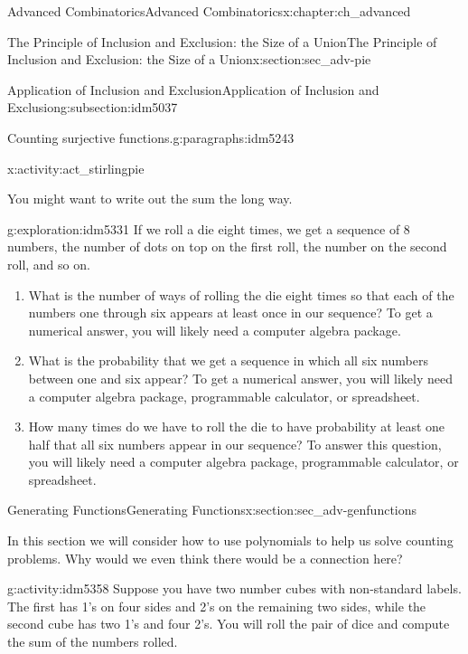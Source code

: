 \documentclass[oneside,10pt,]{book}
\numberwithin{equation}{chapter}
\begin{document}
\begin{chapterptx}{Advanced Combinatorics}{}{Advanced Combinatorics}{}{}{x:chapter:ch_advanced}
\begin{sectionptx}{The Principle of Inclusion and Exclusion: the Size of a Union}{}{The Principle of Inclusion and Exclusion: the Size of a Union}{}{}{x:section:sec_adv-pie}
\begin{subsectionptx}{Application of Inclusion and Exclusion}{}{Application of Inclusion and Exclusion}{}{}{g:subsection:idm5037}
\begin{paragraphs}{Counting surjective functions.}{g:paragraphs:idm5243}
\begin{activity}{}{x:activity:act_stirlingpie}
\begin{enumerate}[font=\bfseries,label=(\alph*),ref=\alph*]
You might want to write out the sum the long way.%
\end{enumerate}
\end{activity}
\begin{exploration}{}{g:exploration:idm5331}%
If we roll a die eight times, we get a sequence of 8 numbers, the number of dots on top on the first roll, the number on the second roll, and so on.%
\begin{enumerate}[font=\bfseries,label=(\alph*),ref=\alph*]
\item{}What is the number of ways of rolling the die eight times so that each of the numbers one through six appears at least once in our sequence? To get a numerical answer, you will likely need a computer algebra package.%
\item{}What is the probability that we get a sequence in which all six numbers between one and six appear? To get a numerical answer, you will likely need a computer algebra package, programmable calculator, or spreadsheet.%
\item{}How many times do we have to roll the die to have probability at least one half that all six numbers appear in our sequence? To answer this question, you will likely need a computer algebra package, programmable calculator, or spreadsheet.%
\end{enumerate}
\end{exploration}
\end{paragraphs}%
\end{subsectionptx}
\end{sectionptx}
%
%
\typeout{************************************************}
\typeout{************************************************}
%
\begin{sectionptx}{Generating Functions}{}{Generating Functions}{}{}{x:section:sec_adv-genfunctions}
\begin{introduction}{}%
In this section we will consider how to use polynomials to help us solve counting problems.  Why would we even think there would be a connection here?%
\begin{activity}{}{g:activity:idm5358}%
Suppose you have two number cubes with non-standard labels.  The first has 1's on four sides and 2's on the remaining two sides, while the second cube has two 1's and four 2's. You will roll the pair of dice and compute the sum of the numbers rolled.%
\begin{enumerate}[font=\bfseries,label=(\alph*),ref=\alph*]

\end{enumerate}
\end{activity}
\end{introduction}
\end{sectionptx}
\end{chapterptx}
\end{document}
